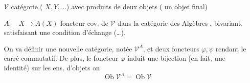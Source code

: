 $\mathcal V$ catégorie ( $X,Y,\ldots$) avec produits de deux objets
( un objet final)

$A:\quad X\longrightarrow A(X)$ foncteur cov. de $\mathcal V$ dans la catégorie
 des Algèbres , bivariant, satisfaisant une condition d'échange
 
(\ldots).

On va définir une nouvelle catégorie, notée $\mathcal V^A$, et
deux foncteurs $\varphi,\psi$
rendant le carré commutatif. De plus,
le foncteur $\varphi$ induit une bijection (en fait,
une identité) sur les ens. d'objets on 
\[
\operatorname{Ob}\mathcal V^A=\operatorname{Ob}\mathcal V
\]

